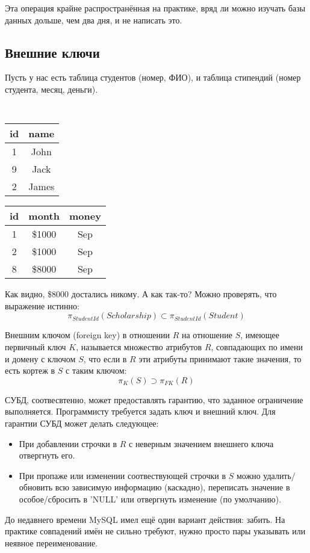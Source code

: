 Эта операция крайне распространённая на практике, вряд ли можно изучать базы данных дольше, чем два дня, и не написать это.

\subsection{Внешние ключи}

Пусть у нас есть таблица студентов (номер, ФИО), и таблица стипендий (номер студента, месяц, деньги).
\begin{center}\tt
\begin{tabular}{|c|c|}
	\hline
	id & name \\\hline
	1 & John \\
	9 & Jack \\
	2 & James \\\hline
\end{tabular} \quad \begin{tabular}{|c|c|c|}
	\hline
	id & month & money \\\hline
	1 & \$1000 & Sep \\
	2 & \$1000 & Sep \\
	8 & \$8000 & Sep \\\hline
\end{tabular}
\end{center}

Как видно, \$8000 достались никому.
А как так-то? Можно проверять, что выражение истинно:
\[ π_{StudentId}(Scholarship) \subset π_{StudentId}(Student) \]

\begin{Def}
	Внешним ключом (foreign key) в отношении $R$ на отношение $S$, имеющее первичный ключ $K$,
	называется множество атрибутов $R$, совпадающих по имени и домену с ключом $S$,
	что если в $R$ эти атрибуты принимают такие значения, то есть кортеж в $S$ с таким ключом:
	\[ π_K(S) ⊃ π_{FK}(R) \]
\end{Def}
СУБД, соотвесвтенно, может предоставлять гарантию, что заданное ограничение выполняется.
Программисту требуется задать ключ и внешний ключ.
Для гарантии СУБД может делать следующее:
\begin{itemize}
\item
	При добавлении строчки в $R$ с неверным значением внешнего ключа отвергнуть его.

\item
	При пропаже или изменении соотвествующей строчки в $S$ можно удалить/обновить всю зависимую информацию (каскадно),
	переписать значение в особое/сбросить в \sql'NULL' или отвергнуть изменение (по умолчанию).
\end{itemize}
До недавнего времени MySQL имел ещё один вариант действия: забить.
На практике совпадений имён не сильно требуют, нужно просто пары указывать или неявное переименование.
